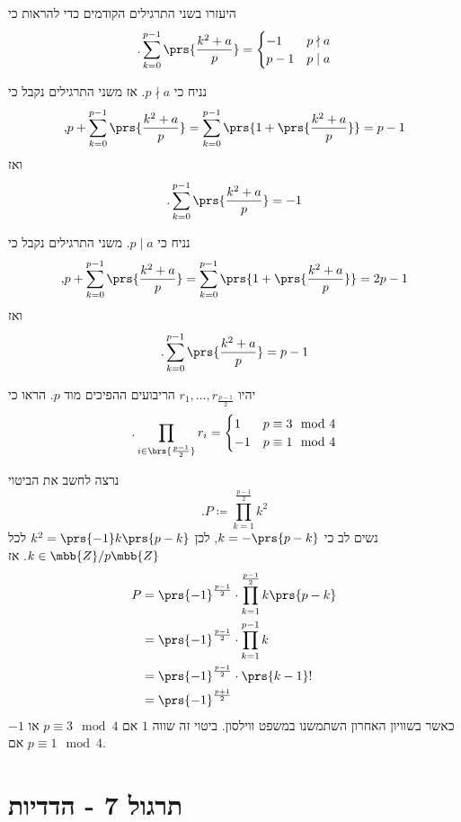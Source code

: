 \documentclass[a4paper,10pt,twoside,openany]{book}
\begin{document}
\begin{exercisechap}
היעזרו בשני התרגילים הקודמים כדי להראות כי
\[\text{.} \sum_{k=0}^{p-1} \prs{\frac{k^2 + a}{p}} = \begin{cases}
-1 & p \nmid a \\
p-1 & p \mid a
\end{cases}\]
\end{exercisechap}

\begin{solution}
נניח כי
$p \nmid a$.
אז משני התרגילים נקבל כי
\[\text{,} p + \sum_{k=0}^{p-1} \prs{\frac{k^2 + a}{p}} = \sum_{k=0}^{p-1} \prs{1 + \prs{\frac{k^2 + a}{p}}} = p-1\]
ואז
\[\text{.} \sum_{k=0}^{p-1} \prs{\frac{k^2 + a}{p}} = -1\]

נניח כי
$p \mid a$.
משני התרגילים נקבל כי
\[\text{,} p + \sum_{k=0}^{p-1} \prs{\frac{k^2 + a}{p}} = \sum_{k=0}^{p-1} \prs{1 + \prs{\frac{k^2 + a}{p}}} = 2p-1\]
ואז
\[\text{.} \sum_{k=0}^{p-1} \prs{\frac{k^2 + a}{p}} = p-1\]
\end{solution}

\begin{exercisechap}
יהיו
$r_1, \ldots, r_{\frac{p-1}{2}}$
הריבועים ההפיכים מוד
$p$.
הראו כי
\[
\text{.} \prod_{i \in \brs{\frac{p-1}{2}}} r_i = \begin{cases}
1 & p \equiv 3 \mod{4} \\
-1 & p \equiv 1 \mod{4}
\end{cases}
\]
\end{exercisechap}

\begin{solution}
נרצה לחשב את הביטוי
\[\text{.} P \coloneqq \prod_{k = 1}^{\frac{p-1}{2}} k^2\]
נשים לב כי
$k = -\prs{p-k}$,
לכן
$k^2 = \prs{-1} k \prs{p-k}$
לכל
$k \in \mbb{Z}/p\mbb{Z}$.
אז
\begin{align*}
P &= \prs{-1}^{\frac{p-1}{2}} \cdot \prod_{k = 1}^{\frac{p-1}{2}} k \prs{p-k}
\\&= \prs{-1}^{\frac{p-1}{2}} \cdot \prod_{k=1}^{p-1} k
\\&= \prs{-1}^{\frac{p-1}{2}} \cdot \prs{k-1}!
\\&= \prs{-1}^{\frac{p+1}{2}}
\end{align*}
כאשר בשוויון האחרון השתמשנו במשפט ווילסון.
ביטוי זה שווה
$1$
אם
$p \equiv 3 \mod{4}$
או
$-1$
אם
$p \equiv 1 \mod{4}$.
\end{solution}

\chapter{תרגול 7 - הדדיות }
\end{document}
